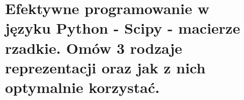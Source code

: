 \section{Efektywne programowanie w języku Python - Scipy - macierze rzadkie. Omów 3 rodzaje reprezentacji oraz jak z nich optymalnie korzystać.}
